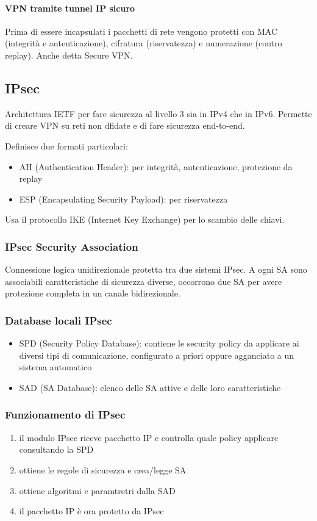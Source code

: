 \documentclass[11pt]{article}
\begin{document}
\paragraph*{VPN tramite tunnel IP sicuro}
Prima di essere incapsulati i pacchetti di rete vengono protetti con MAC (integrità e autenticazione), cifratura (riservatezza)
e numerazione (contro replay). Anche detta Secure VPN.
\subsection{IPsec}
Architettura IETF per fare sicurezza al livello 3 sia in IPv4 che in IPv6. Permette di creare VPN su reti non dfidate e 
di fare sicurezza end-to-end.

Definisce due formati particolari:
\begin{itemize}
    \item AH (Authentication Header): per integrità, autenticazione, protezione da replay
    \item ESP (Encapsulating Security Payload): per riservatezza 
\end{itemize}
Usa il protocollo IKE (Internet Key Exchange) per lo scambio delle chiavi.
\subsubsection{IPsec Security Association}
Connessione logica unidirezionale protetta tra due sistemi IPsec. A ogni SA sono associabili caratteristiche di sicurezza 
diverse, occorrono due SA per avere protezione completa in un canale bidirezionale.
\subsubsection{Database locali IPsec}
\begin{itemize}
    \item SPD (Security Policy Database): contiene le security policy da applicare ai diversi tipi di comunicazione, configurato 
    a priori oppure agganciato a un sistema automatico 
    \item SAD (SA Database): elenco delle SA attive e delle loro caratteristiche
\end{itemize}
\subsubsection{Funzionamento di IPsec}
\begin{enumerate}
    \item il modulo IPsec riceve pacchetto IP e controlla quale policy applicare consultando la SPD 
    \item ottiene le regole di sicurezza e crea/legge SA 
    \item ottiene algoritmi e paramtretri dalla SAD 
    \item il pacchetto IP è ora protetto da IPsec
\end{enumerate}
\end{document}
